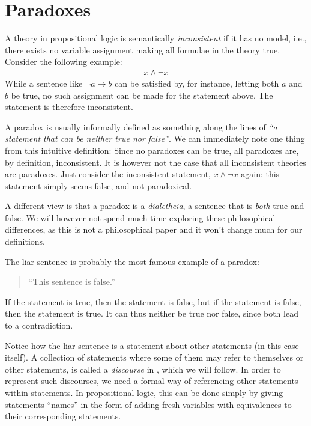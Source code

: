 \section{Paradoxes}
\label{sec:Paradoxes}
A theory in propositional logic is semantically \textit{inconsistent} if it has no model, i.e., there exists no variable assignment making all formulae in the theory true.
Consider the following example:
\begin{align}
  x \wedge \neg x
\end{align}
While a sentence like $\neg a \rightarrow b$ can be satisfied by, for instance, letting both $a$ and $b$ be true, no such assignment can be made for the statement above.
The statement is therefore inconsistent.

A paradox is usually informally defined as something along the lines of \textit{``a statement that can be neither true nor false''}.
We can immediately note one thing from this intuitive definition:
Since no paradoxes can be true, all paradoxes are, by definition, inconsistent.
It is however not the case that all inconsistent theories are paradoxes.
Just consider the inconsistent statement, $x \wedge \neg x$ again: this statement simply seems false, and not paradoxical.

A different view is that a paradox is a \textit{dialetheia}, a sentence that is \textit{both} true and false\cite{sep-dialetheism}. We will however not spend much time exploring these philosophical differences, as this is not a philosophical paper and it won't change much for our definitions.

The liar sentence is probably the most famous example of a paradox:
\begin{quote}
  ``This sentence is false.''
\end{quote}
If the statement is true, then the statement is false, but if the statement is false, then the statement is true.
It can thus neither be true nor false, since both lead to a contradiction.

Notice how the liar sentence is a statement about other statements (in this case itself).
A collection of statements where some of them may refer to themselves or other statements, is called a \textit{discourse} in \cite{synthese-pdl}, which we will follow.
In order to represent such discourses, we need a formal way of referencing other statements within statements.
In propositional logic, this can be done simply by giving statements ``names'' in the form of adding fresh variables with equivalences to their corresponding statements.

